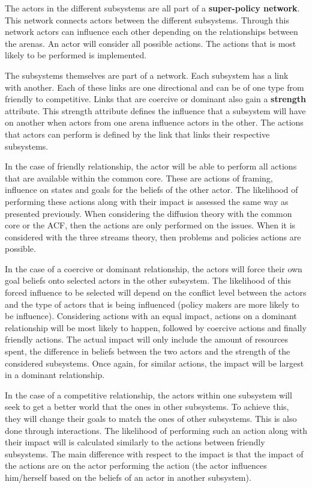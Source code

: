 The actors in the different subsystems are all part of a {\bfseries super-policy network}. This network connects actors between the different subsystems. Through this network actors can influence each other depending on the relationships between the arenas. An actor will consider all possible actions. The actions that is most likely to be performed is implemented.

The subsystems themselves are part of a network. Each subsystem has a link with another. Each of these links are one directional and can be of one type from friendly to competitive. Links that are coercive or dominant also gain a {\bfseries strength} attribute. This strength attribute defines the influence that a subsystem will have on another when actors from one arena influence actors in the other. The actions that actors can perform is defined by the link that links their respective subsystems.

In the case of friendly relationship, the actor will be able to perform all actions that are available within the common core. These are actions of framing, influence on states and goals for the beliefs of the other actor. The likelihood of performing these actions along with their impact is assessed the same way as presented previously. When considering the diffusion theory with the common core or the ACF, then the actions are only performed on the issues. When it is considered with the three streams theory, then problems and policies actions are possible.

In the case of a coercive or dominant relationship, the actors will force their own goal beliefs onto selected actors in the other subsystem. The likelihood of this forced influence to be selected will depend on the conflict level between the actors and the type of actors that is being influenced (policy makers are more likely to be influence). Considering actions with an equal impact, actions on a dominant relationship will be most likely to happen, followed by coercive actions and finally friendly actions. The actual impact will only include the amount of resources spent, the difference in beliefs between the two actors and the strength of the considered subsystems. Once again, for similar actions, the impact will be largest in a dominant relationship.

In the case of a competitive relationship, the actors within one subsystem will seek to get a better world that the ones in other subsystems. To achieve this, they will change their goals to match the ones of other subsystems. This is also done through interactions. The likelihood of performing such an action along with their impact will is calculated similarly to the actions between friendly subsystems. The main difference with respect to the impact is that the impact of the actions are on the actor performing the action (the actor influences him/herself based on the beliefs of an actor in another subsystem).
